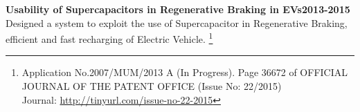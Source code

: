 
\reversemarginpar {}
\noindent \textbf{Usability of Supercapacitors in Regenerative Braking in EVs\hfill 2013-2015
}\\
Designed a system to exploit the use of Supercapacitor in Regenerative Braking, efficient and fast recharging of Electric Vehicle. \footnote{Application No.2007/MUM/2013 A (In Progress). Page 36672 of OFFICIAL JOURNAL OF THE PATENT OFFICE (Issue No: 22/2015)\\
Journal: \url{http://tinyurl.com/issue-no-22-2015}}
\\
